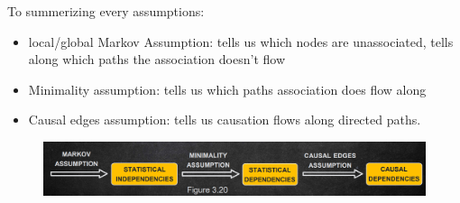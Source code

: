 To summerizing every assumptions:
\begin{itemize}
    \item local/global Markov Assumption: tells us which nodes are unassociated, tells
          along which paths the association doesn't flow
    \item Minimality assumption: tells us which paths association does flow along
    \item Causal edges assumption: tells us causation flows along directed paths.
\end{itemize}
\begin{figure}[!h]
    \centering
    \includegraphics*[width=\textwidth]{img/causal_networks_assumptions.png}
\end{figure}


